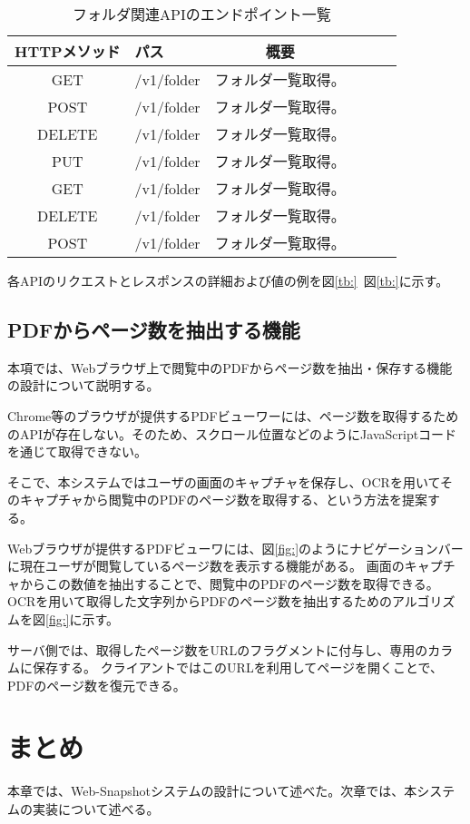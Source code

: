 \begin{table}[h]
  \begin{center}
  \caption{フォルダ関連APIのエンドポイント一覧}
  \label{tb:content-api-endpoint}
      \begin{tabular}{|cl|cl|cl|} \hline
      HTTPメソッド & パス & 概要 \\ \hline
      GET& /v1/folder & フォルダ一覧取得。 \\ \hline
      POST& /v1/folder & フォルダ一覧取得。 \\ \hline
      DELETE& /v1/folder & フォルダ一覧取得。 \\ \hline
      PUT& /v1/folder & フォルダ一覧取得。 \\ \hline
      GET& /v1/folder & フォルダ一覧取得。 \\ \hline
      DELETE& /v1/folder & フォルダ一覧取得。 \\ \hline
      POST& /v1/folder & フォルダ一覧取得。 \\ \hline
      \end{tabular}
  \end{center}
\end{table}

各APIのリクエストとレスポンスの詳細および値の例を図\ref{tb:}~図\ref{tb:}に示す。

\subsection{PDFからページ数を抽出する機能}
本項では、Webブラウザ上で閲覧中のPDFからページ数を抽出・保存する機能の設計について説明する。

Chrome等のブラウザが提供するPDFビューワーには、ページ数を取得するためのAPIが存在しない。そのため、スクロール位置などのようにJavaScriptコードを通じて取得できない。

そこで、本システムではユーザの画面のキャプチャを保存し、OCRを用いてそのキャプチャから閲覧中のPDFのページ数を取得する、という方法を提案する。

Webブラウザが提供するPDFビューワには、図\ref{fig:}のようにナビゲーションバーに現在ユーザが閲覧しているページ数を表示する機能がある。
画面のキャプチャからこの数値を抽出することで、閲覧中のPDFのページ数を取得できる。
OCRを用いて取得した文字列からPDFのページ数を抽出するためのアルゴリズムを図\ref{fig:}に示す。

サーバ側では、取得したページ数をURLのフラグメントに付与し、専用のカラムに保存する。
クライアントではこのURLを利用してページを開くことで、PDFのページ数を復元できる。

\section{まとめ}
本章では、Web-Snapshotシステムの設計について述べた。次章では、本システムの実装について述べる。
